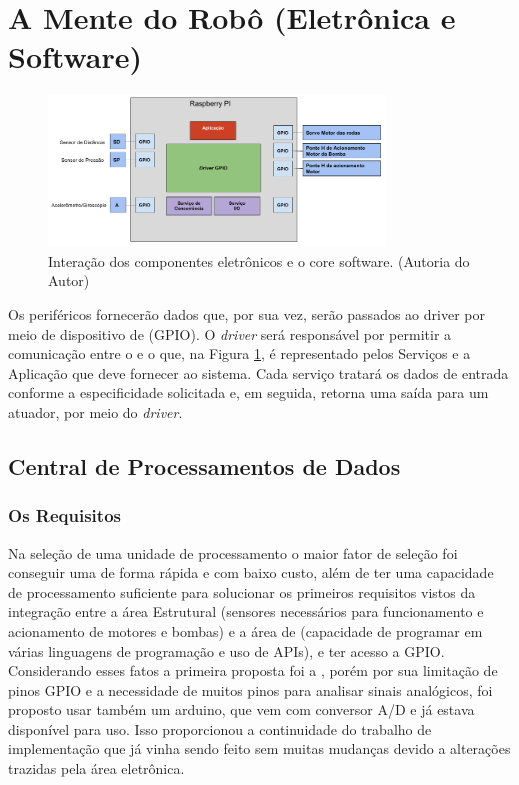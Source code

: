 \section{A Mente do Robô (Eletrônica e Software)}
\par
\begin{figure}[h]
  \centering
  \includegraphics[width=0.8\textwidth]{figures/schema-eletro-soft.png}
  \caption{Interação dos componentes eletrônicos e o core software. (\textsf{Autoria do Autor)}}
  \label{fig:schema-eletro-soft}
\end{figure}
\FloatBarrier
\par
Os periféricos fornecerão dados que, por sua vez, serão passados ao driver por meio de dispositivo de \hardware (GPIO). O \textit{driver} será responsável por permitir a comunicação entre o \hardware e o \software que, na Figura \ref{fig:schema-eletro-soft}, é representado pelos Serviços e a Aplicação que deve fornecer ao sistema. Cada serviço tratará os dados de entrada conforme a especificidade solicitada e, em seguida, retorna uma saída para um atuador, por meio do \textit{driver}.

\subsection{Central de Processamentos de Dados}
\subsubsection{Os Requisitos}
Na seleção de uma unidade de processamento o maior fator de seleção foi conseguir uma de forma rápida e com baixo custo, além de ter uma capacidade de processamento suficiente para solucionar os primeiros requisitos vistos da integração entre a área Estrutural (sensores necessários para funcionamento e acionamento de motores e bombas) e a área de \software (capacidade de programar em várias linguagens de programação e uso de \textsf{APIs}), e ter acesso a GPIO. Considerando esses fatos a primeira proposta foi a \rasp, porém por sua limitação de pinos GPIO e a necessidade de muitos pinos para analisar sinais analógicos, foi proposto usar também um arduino, que vem com conversor A/D e já estava disponível para uso. Isso proporcionou a continuidade do trabalho de implementação que já vinha sendo feito sem muitas mudanças devido a alterações trazidas pela área eletrônica.

